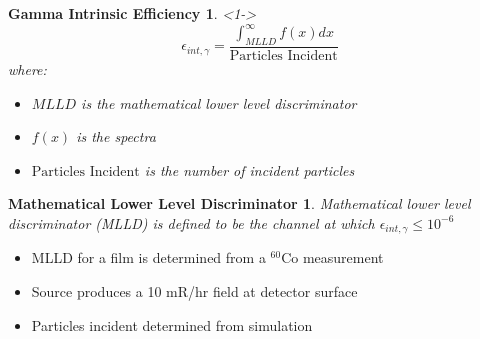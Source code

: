 \begin{frame}
	\newtheorem{thm8}{Gamma Intrinsic Efficiency}
	\begin{thm8}<1->
		$$ \epsilon_{int,\gamma} = \frac{\int_{MLLD}^{\infty}{f(x)dx}}{\text{Particles Incident}} $$
	where:
	\begin{itemize}
		\tiny
		\item $MLLD$ is the mathematical lower level discriminator
		\item $f(x)$ is the spectra
		\item $\text{Particles Incident}$ is the number of incident particles
	\end{itemize}
	\end{thm8}
	\newtheorem{rmk1}{Mathematical Lower Level Discriminator}
	\begin{rmk1}
		\tiny
		Mathematical lower level discriminator (MLLD) is defined to be the channel at which $\epsilon_{int,\gamma} \leq 10^{-6}$
	\end{rmk1}

	\begin{itemize}
		\tiny
		\item MLLD for a film is determined from a ${}^{60}$Co measurement
		\item Source produces a 10 mR/hr field at detector surface
		\item Particles incident determined from simulation
	\end{itemize}
\end{frame}
